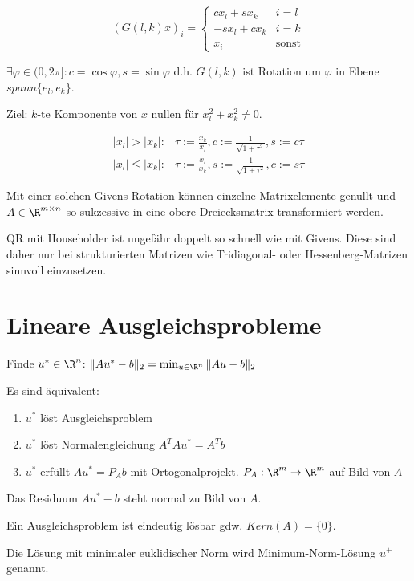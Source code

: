 \vspace{-4mm}
$$(G(l,k)x)_i = \begin{cases}
	 cx_l + sx_k & i=l \\
	-sx_l + cx_k & i=k \\
	x_i          & \text{sonst}
\end{cases}$$

$\exists \varphi \in (0,2\pi] : c=\cos{\varphi}, s=\sin{\varphi}$ d.h. $G(l,k)$ ist Rotation um $\varphi$ in Ebene $spann\{e_l,e_k\}$.

Ziel: $k$-te Komponente von $x$ nullen für $x_l^2+x_k^2 \neq 0$.

\vspace{-4mm}
\begin{align*}
	|x_l| > |x_k| : &\tau := \frac{x_k}{x_l}, c := \frac{1}{\sqrt{1+\tau^2}}, s := c\tau \\
	|x_l| \leq |x_k| : &\tau := \frac{x_l}{x_k}, s := \frac{1}{\sqrt{1+\tau^2}}, c := s\tau
\end{align*}

Mit einer solchen Givens-Rotation können einzelne Matrixelemente genullt und $A \in \R^{m \times n}$ so sukzessive in eine obere Dreiecksmatrix transformiert werden.

QR mit Householder ist ungefähr doppelt so schnell wie mit Givens. Diese sind daher nur bei strukturierten Matrizen wie Tridiagonal- oder Hessenberg-Matrizen sinnvoll einzusetzen.

\section*{Lineare Ausgleichsprobleme}

Finde $u^* \in \R^n$: $\|Au^*-b\|_2 = \min_{u\in \R^n} \|Au-b\|_2$

Es sind äquivalent:

\begin{enumerate}[label=(\alph*)]
	\item $u^*$ löst Ausgleichsproblem
	\item $u^*$ löst Normalengleichung $A^TAu^*=A^Tb$
	\item $u^*$ erfüllt $Au^* = P_Ab$ mit Ortogonalprojekt. $P_A : \R^m \rightarrow \R^m$ auf Bild von $A$
\end{enumerate}

Das Residuum $Au^*-b$ steht normal zu Bild von $A$.

Ein Ausgleichsproblem ist eindeutig lösbar gdw. $Kern(A) = \{0\}$.

Die Lösung mit minimaler euklidischer Norm wird Minimum-Norm-Lösung $u^+$ genannt.

